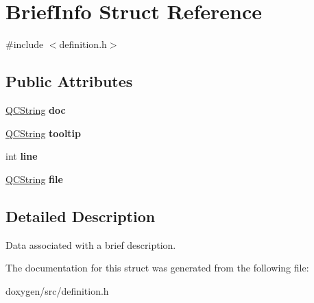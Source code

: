 \hypertarget{struct_brief_info}{}\section{Brief\+Info Struct Reference}
\label{struct_brief_info}


{\ttfamily \#include $<$definition.\+h$>$}

\subsection*{Public Attributes}
\begin{DoxyCompactItemize}
\item 
\mbox{\label{struct_brief_info_aecb19c35c099c07820b74f23fc298a82}} 
\mbox{\hyperlink{class_q_c_string}{Q\+C\+String}} {\bfseries doc}
\item 
\mbox{\label{struct_brief_info_a5b7799657df3d9b893527be844a55562}} 
\mbox{\hyperlink{class_q_c_string}{Q\+C\+String}} {\bfseries tooltip}
\item 
\mbox{\label{struct_brief_info_adae4029a5e60d63720902578c56fd95b}} 
int {\bfseries line}
\item 
\mbox{\label{struct_brief_info_ac97b972247e0c7ac3ccf1e1bd29cf77e}} 
\mbox{\hyperlink{class_q_c_string}{Q\+C\+String}} {\bfseries file}
\end{DoxyCompactItemize}


\subsection{Detailed Description}
Data associated with a brief description. 

The documentation for this struct was generated from the following file\+:\begin{DoxyCompactItemize}
\item 
doxygen/src/definition.\+h\end{DoxyCompactItemize}
